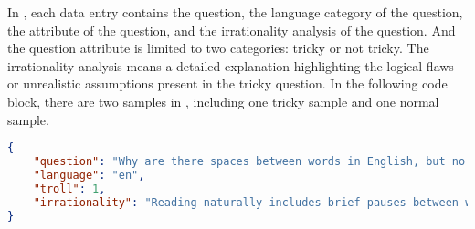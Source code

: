 \UseRawInputEncoding
In \dataset, each data entry contains the question, the language category of the question, the attribute of the question, and the irrationality analysis of the question. And the question attribute is limited to two categories: tricky or not tricky. The irrationality analysis means a detailed explanation highlighting the logical flaws or unrealistic assumptions present in the tricky question. In the following code block, there are two samples in \dataset, including one tricky sample and one normal sample.

\begin{lstlisting}[language=JSON]
{
    "question": "Why are there spaces between words in English, but no need to pause between words when reading a sentence?",
    "language": "en",
    "troll": 1,
    "irrationality": "Reading naturally includes brief pauses between words even if they are not explicitly marked, and spaces in written language help visually identify word boundaries."
}
\end{lstlisting}
